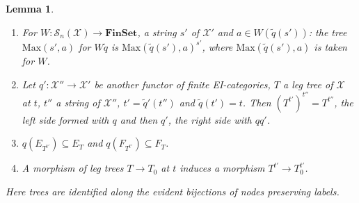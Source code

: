 \documentclass[11pt]{amsart}
\newtheorem{lem}[thm]{Lemma}
\theoremstyle{definition}
\newcommand{\Fin}{\mathbf{FinSet}}
\newcommand{\Max}{\mathrm{Max}}
\newcommand{\cX}{\mathcal X}
\newcommand{\cS}{\mathcal S}
\begin{document}
\begin{lem}\label{lem:pull}
\begin{enumerate}
\item[(P1)] For $W\colon\cS_n(\cX)\to\Fin$, a string $s'$ of $\cX'$
and $a\in W(\tilde q(s'))$: the tree $\Max(s',a)$ for $W\tilde q$ is
$\Max(\tilde q(s'),a)^{s'}$, where $\Max(\tilde q(s'),a)$ is taken for
$W$.
\item[(P2)] Let $q'\colon\cX''\to\cX'$ be another functor of finite
EI-categories, $T$ a leg tree of $\cX$ at $t$, $t''$ a string of
$\cX''$, $t'=\tilde q'(t'')$ and $\tilde q(t')=t$. Then
$(T^{t'})^{t''}=T^{t''}$, the left side formed with $q$ and then $q'$,
the right side with $qq'$.
\item[(P3)] $q(E_{T^{t'}})\subseteq E_T$ and $q(F_{T^{t'}})\subseteq
F_T$.
\item[(P4)] A morphism of leg trees $T\to T_0$ at $t$ induces a
morphism $T^{t'}\to T_0^{t'}$.
\end{enumerate}
Here trees are identified along the evident bijections of nodes
preserving labels.
\end{lem}
\end{document}
